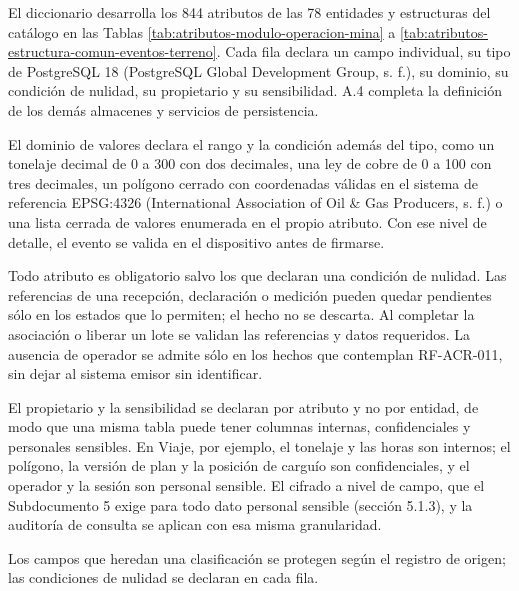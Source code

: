 \documentclass[anexo]{../../comun/overfore}
\begin{document}
El diccionario desarrolla los 844 atributos de las 78 entidades y estructuras del catálogo en las Tablas \ref{tab:atributos-modulo-operacion-mina} a \ref{tab:atributos-estructura-comun-eventos-terreno}. Cada fila declara un campo individual, su tipo de PostgreSQL 18 (PostgreSQL Global Development Group, s. f.), su dominio, su condición de nulidad, su propietario y su sensibilidad. A.4 completa la definición de los demás almacenes y servicios de persistencia.

El dominio de valores declara el rango y la condición además del tipo, como un tonelaje decimal de 0 a 300 con dos decimales, una ley de cobre de 0 a 100 con tres decimales, un polígono cerrado con coordenadas válidas en el sistema de referencia EPSG:4326 (International Association of Oil \& Gas Producers, s. f.) o una lista cerrada de valores enumerada en el propio atributo. Con ese nivel de detalle, el evento se valida en el dispositivo antes de firmarse.

Todo atributo es obligatorio salvo los que declaran una condición de nulidad. Las referencias de una recepción, declaración o medición pueden quedar pendientes sólo en los estados que lo permiten; el hecho no se descarta. Al completar la asociación o liberar un lote se validan las referencias y datos requeridos. La ausencia de operador se admite sólo en los hechos que contemplan RF-ACR-011, sin dejar al sistema emisor sin identificar.

El propietario y la sensibilidad se declaran por atributo y no por entidad, de modo que una misma tabla puede tener columnas internas, confidenciales y personales sensibles. En Viaje, por ejemplo, el tonelaje y las horas son internos; el polígono, la versión de plan y la posición de carguío son confidenciales, y el operador y la sesión son personal sensible. El cifrado a nivel de campo, que el Subdocumento 5 exige para todo dato personal sensible (sección 5.1.3), y la auditoría de consulta se aplican con esa misma granularidad.

Los campos que heredan una clasificación se protegen según el registro de origen; las condiciones de nulidad se declaran en cada fila.
\end{document}
